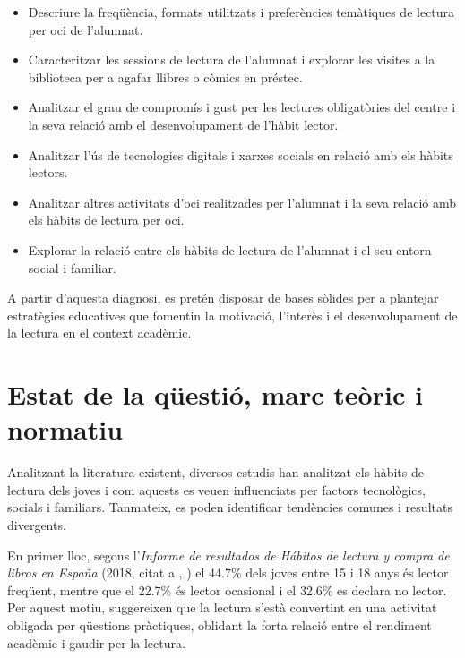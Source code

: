 \documentclass[12pt]{article}
\newcommand{\nestedtextcite}[2]{%
  (#1, citat a \citeauthor{#2}, \citeyear{#2})%
}
\begin{document}
\begin{itemize}
    \item Descriure la freqüència, formats utilitzats i preferències temàtiques de lectura per oci de l’alumnat.
    \item Caracteritzar les sessions de lectura de l'alumnat i explorar les visites a la biblioteca per a agafar llibres o còmics en préstec.
    \item Analitzar el grau de compromís i gust per les lectures obligatòries del centre i la seva relació amb el desenvolupament de l’hàbit lector.
    \item Analitzar l’ús de tecnologies digitals i xarxes socials en relació amb els hàbits lectors.
    \item Analitzar altres activitats d'oci realitzades per l'alumnat i la seva relació amb els hàbits de lectura per oci.
    \item Explorar la relació entre els hàbits de lectura de l’alumnat i el seu entorn social i familiar.
\end{itemize}

A partir d’aquesta diagnosi, es pretén disposar de bases sòlides per a plantejar estratègies educatives que fomentin la motivació, l’interès i el desenvolupament de la lectura en el context acadèmic.

\newpage
\section{Estat de la qüestió, marc teòric i normatiu}
Analitzant la literatura existent, diversos estudis han analitzat els hàbits de lectura dels joves i com aquests es veuen influenciats per factors tecnològics, socials i familiars. Tanmateix, es poden identificar tendències comunes i resultats divergents.

En primer lloc, segons l'\emph{Informe de resultados de Hábitos de lectura y compra de libros en España} \nestedtextcite{2018}{sanches} el 44.7\% dels joves entre 15 i 18 anys és lector freqüent, mentre que el 22.7\% és lector ocasional i el 32.6\% es declara no lector. Per aquest motiu, \textcite{sanches} suggereixen que la lectura s'està convertint en una activitat obligada per qüestions pràctiques, oblidant la forta relació entre el rendiment acadèmic i gaudir per la lectura.
\end{document}

